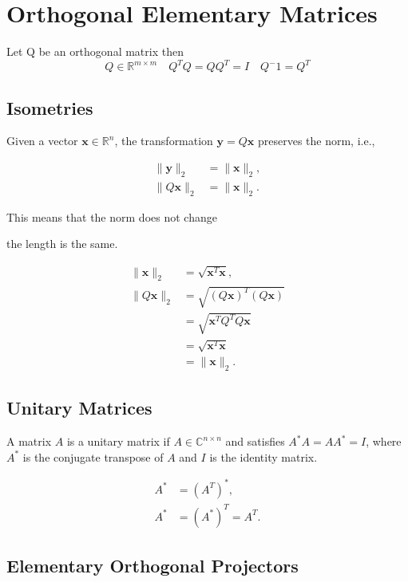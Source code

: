 \chapter[short]{Orthogonal Elementary Matrices}
Let Q be an orthogonal matrix then
$$Q \in \mathbb{R}^{m \times m} \quad Q^TQ = QQ^T = I \quad Q^-1 = Q^T $$

\section{Isometries}
Given a vector \( \mathbf{x} \in \mathbb{R}^n \), the transformation \( \mathbf{y} = Q\mathbf{x} \) preserves the norm, i.e.,

\begin{align*}
\| \mathbf{y} \|_2 &= \| \mathbf{x} \|_2, \\
\| Q\mathbf{x} \|_2 &= \| \mathbf{x} \|_2.
\end{align*}

This means that the norm does not change

the length is the same.

\begin{align*}
\| \mathbf{x} \|_2 &= \sqrt{\mathbf{x}^T \mathbf{x}}, \\
\| Q\mathbf{x} \|_2 &= \sqrt{(Q\mathbf{x})^T (Q\mathbf{x})} \\
&= \sqrt{\mathbf{x}^T Q^T Q \mathbf{x}} \\
&= \sqrt{\mathbf{x}^T \mathbf{x}} \\
&= \| \mathbf{x} \|_2.
\end{align*}

\section{Unitary Matrices}
A matrix \( A \) is a unitary matrix if \( A \in \mathbb{C}^{n \times n} \) and satisfies \( A^*A = AA^* = I \), where \( A^* \) is the conjugate transpose of \( A \) and \( I \) is the identity matrix.

\begin{align*}
A^* &= (A^T)^*, \\
A^* &= (A^*)^T = A^T.
\end{align*}

\section{Elementary Orthogonal Projectors}

